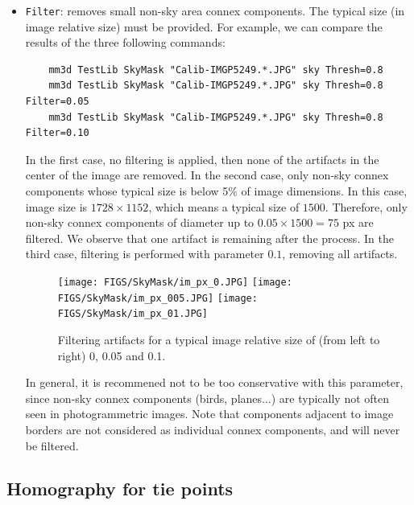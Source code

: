 \begin{itemize}
	\item \texttt{Filter}: removes small non-sky area connex components. The typical size (in image relative size) must be provided. For example, we can compare the results of the three following commands: \newline
	
	\begin{verbatim}
	mm3d TestLib SkyMask "Calib-IMGP5249.*.JPG" sky Thresh=0.8
	mm3d TestLib SkyMask "Calib-IMGP5249.*.JPG" sky Thresh=0.8 Filter=0.05
	mm3d TestLib SkyMask "Calib-IMGP5249.*.JPG" sky Thresh=0.8 Filter=0.10
	\end{verbatim}   
	
	\vspace{0.5cm}
	
	In the first case, no filtering is applied, then none of the artifacts in the center of the image are removed. In the second case, only non-sky connex components whose typical size is below 5\% of image dimensions. In this case, image size is $1728 \times 1152$, which means a typical size of $1500$. Therefore, only non-sky connex components of diameter up to $0.05 \times 1500 = 75$ px are filtered. We observe that one artifact is remaining after the process. In the third case, filtering is performed with parameter $0.1$, removing all artifacts. \newline
	
		\begin{figure}[!h]
		\begin{center}
			\texttt{[image: FIGS/SkyMask/im\_px\_0.JPG]}
			\texttt{[image: FIGS/SkyMask/im\_px\_005.JPG]}
			\texttt{[image: FIGS/SkyMask/im\_px\_01.JPG]}
			\caption{Filtering artifacts for a typical image relative size of (from left to right) 0, 0.05 and 0.1.}
		\end{center}	
	\end{figure}

	In general, it is recommened not to be too conservative with this parameter, since non-sky connex components (birds, planes...) are typically not often seen in photogrammetric images. Note that components adjacent to image borders are not considered as individual connex components, and will never be filtered. \newline
	
\end{itemize}




\subsection{Homography for tie points}
\vspace{0.5cm}

